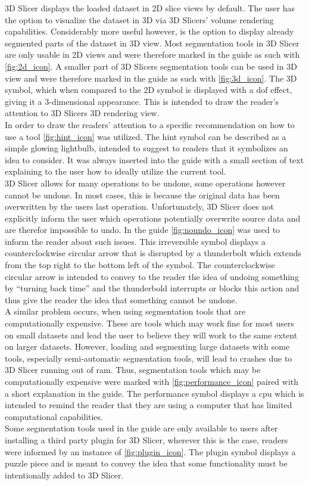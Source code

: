 \noindent
3D Slicer displays the loaded dataset in 2D slice views by default.
The user has the option to visualize the dataset in 3D via 3D Slicers' volume rendering capabilities.
Considerably more useful however, is the option to display already segmented parts of the dataset in 3D view.
Most segmentation tools in 3D Slicer are only usable in 2D views and were therefore marked in the guide as such with \cref{fig:2d_icon}.
A smaller part of 3D Slicers segmentation tools can be used in 3D view and were therefore marked in the guide as such with \cref{fig:3d_icon}.
The 3D symbol, which when compared to the 2D symbol is displayed with a \acrfull{dof} effect, giving it a 3-dimensional appearance.
This is intended to draw the reader's attention to 3D Slicers 3D rendering view.\\
In order to draw the readers' attention to a specific recommendation on how to use a tool \cref{fig:hint_icon} was utilized.
The hint symbol can be described as a simple glowing lightbulb, intended to suggest to readers that it symbolizes an idea to consider.
It was always inserted into the guide with a small section of text explaining to the user how to ideally utilize the current tool.\\
3D Slicer allows for many operations to be undone, some operations however cannot be undone.
In most cases, this is because the original data has been overwritten by the users last operation.
Unfortunately, 3D Slicer does not explicitly inform the user which operations potentially overwrite source data and are therefor impossible to undo.
In the guide \cref{fig:noundo_icon} was used to inform the reader about such issues.
This irreversible symbol displays a counterclockwise circular arrow that is disrupted by a thunderbolt which extends from the top right to the bottom left of the symbol.
The counterclockwise circular arrow is intended to convey to the reader the idea of undoing something by ``turning back time'' and the thunderbold interrupts or blocks this action and thus give the reader the idea that something cannot be undone.\\
A similar problem occurs, when using segmentation tools that are computationally expensive.
These are tools which may work fine for most users on small datasets and lead the user to believe they will work to the same extent on larger datasets.
However, loading and segmenting large datasets with some tools, especially semi-automatic segmentation tools, will lead to crashes due to 3D Slicer running out of \acrfull{ram}.
Thus, segmentation tools which may be computationally expensive were marked with \cref{fig:performance_icon} paired with a short explanation in the guide.
The performance symbol displays a \acrfull{cpu} which is intended to remind the reader that they are using a computer that has limited computational capabilities.\\
Some segmentation tools used in the guide are only available to users after installing a third party plugin for 3D Slicer, wherever this is the case, readers were informed by an instance of \cref{fig:plugin_icon}.
The plugin symbol displays a puzzle piece and is meant to convey the idea that some functionality must be intentionally added to 3D Slicer.
